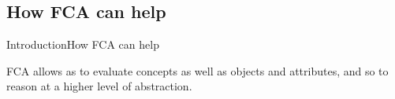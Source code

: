 \subsection{How FCA can help}
\begin{frame}{Introduction}{How FCA can help}

FCA allows as to evaluate concepts as well as objects and attributes, and so to 
reason at a higher level of abstraction.

\end{frame}